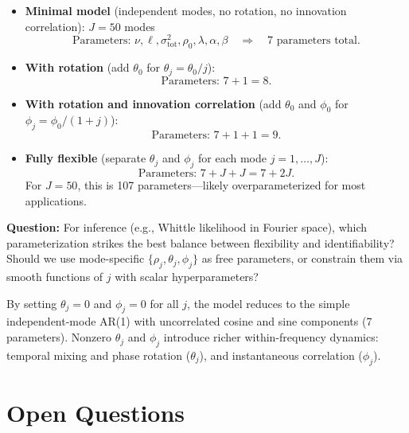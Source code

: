 \documentclass[answers,12pt,addpoints]{exam}
\begin{document}
\begin{itemize}
  \item \textbf{Minimal model} (independent modes, no rotation, no innovation correlation): $J=50$ modes
    \[
      \text{Parameters: } \nu, \ell, \sigma^2_{\text{tot}}, \rho_0, \lambda, \alpha, \beta
      \quad \Rightarrow \quad 7 \text{ parameters total.}
    \]
  
  \item \textbf{With rotation} (add $\theta_0$ for $\theta_j = \theta_0/j$):
    \[
      \text{Parameters: } 7 + 1 = 8.
    \]
  
  \item \textbf{With rotation and innovation correlation} (add $\theta_0$ and $\phi_0$ for $\phi_j = \phi_0/(1+j)$):
    \[
      \text{Parameters: } 7 + 1 + 1 = 9.
    \]
  
  \item \textbf{Fully flexible} (separate $\theta_j$ and $\phi_j$ for each mode $j=1,\dots,J$):
    \[
      \text{Parameters: } 7 + J + J = 7 + 2J.
    \]
    For $J=50$, this is 107 parameters—likely overparameterized for most applications.
\end{itemize}

{\color{blue}
\textbf{Question:} For inference (e.g., Whittle likelihood in Fourier space), which parameterization strikes the best balance between flexibility and identifiability? Should we use mode-specific $\{\rho_j, \theta_j, \phi_j\}$ as free parameters, or constrain them via smooth functions of $j$ with scalar hyperparameters?
}

By setting $\theta_j = 0$ and $\phi_j = 0$ for all $j$, the model reduces to the simple independent-mode AR(1) with uncorrelated cosine and sine components (7 parameters). Nonzero $\theta_j$ and $\phi_j$ introduce richer within-frequency dynamics: temporal mixing and phase rotation ($\theta_j$), and instantaneous correlation ($\phi_j$).

\section*{Open Questions}
\end{document}
